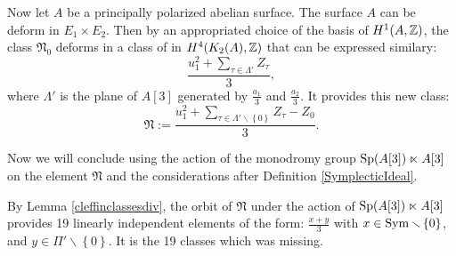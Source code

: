 Now let $A$ be a principally polarized abelian surface. The surface $A$ can be deform in $E_1\times E_2$. Then by an appropriated choice of the basis of $H^1(A,\mathbb{Z})$, the class $\mathfrak{N}_0$ deforms in a class of in $ H^{4}(K_2(A),\mathbb{Z})$ that can be expressed similary:
$$\frac{u_1^2+\sum_{\tau\in \Lambda'} Z_{\tau}}{3},$$
where $\Lambda'$ is the plane of $A[3]$ generated by $\frac{a_1}{3}$ and $\frac{a_2}{3}$.
It provides this new class:
$$\mathfrak{N}:=\frac{u_1^2+\sum_{\tau\in \Lambda'\smallsetminus \left\{0\right\}} Z_{\tau}-Z_0}{3}.$$

Now we will conclude using the action of the monodromy group $\operatorname{Sp}(A[3])\ltimes A[3]$ on the element $\mathfrak{N}$ and the considerations after Definition \ref{SymplecticIdeal}. 

By Lemma \ref{cleffinclassesdiv}, the orbit of $\mathfrak{N}$ under the action of $\operatorname{Sp}(A[3])\ltimes A[3]$ provides 19 linearly independent elements of the form:
$\frac{x+y}{3}$ with $x\in \operatorname{Sym}\smallsetminus \left\{0\right\}$, and $y\in \Pi'\smallsetminus \left\{0\right\}$. It is the 19 classes which was missing. 